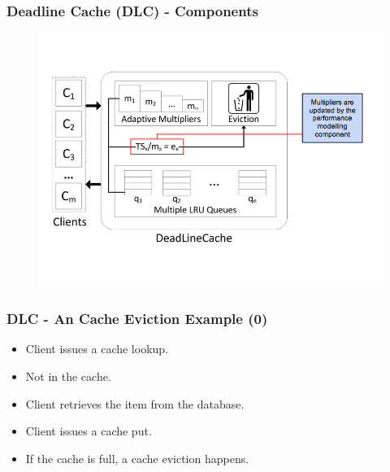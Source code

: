 \documentclass{beamer}
\begin{document}
\begin{frame}
  \frametitle{Deadline Cache (DLC) - Components}
  \begin{figure}
    \begin{center}
      \centerline{\includegraphics[scale=0.38]{img/DLC_ARC_3.png}}
    \end{center}
  \end{figure}
\end{frame}

\begin{frame}
  \frametitle{DLC - An Cache Eviction Example (0)}
  \begin{itemize}
  \item Client issues a cache lookup.
  \item Not in the cache.
  \item Client retrieves the item from the database.
  \item Client issues a cache put.
  \item If the cache is full, a cache eviction happens.
  \end{itemize}
\end{frame}
\end{document}
